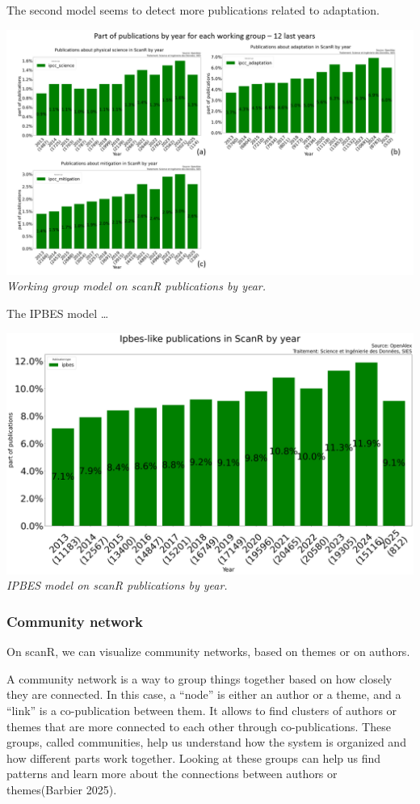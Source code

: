 \documentclass[
]{article}
\begin{document}
The second model seems to detect more publications related to
adaptation.

\includegraphics{./images/teds_model_scanR_wg.png} \emph{Working group
model on scanR publications by year.}

The IPBES model \ldots{}

\includegraphics{./images/teds_model_scanR2.png} \emph{IPBES model on
scanR publications by year.}

\hypertarget{community-network}{%
\subsubsection{Community network}\label{community-network}}

On scanR, we can visualize community networks, based on themes or on
authors.

A community network is a way to group things together based on how
closely they are connected. In this case, a ``node'' is either an author
or a theme, and a ``link'' is a co-publication between them. It allows
to find clusters of authors or themes that are more connected to each
other through co-publications. These groups, called communities, help us
understand how the system is organized and how different parts work
together. Looking at these groups can help us find patterns and learn
more about the connections between authors or themes(Barbier 2025).
\end{document}

